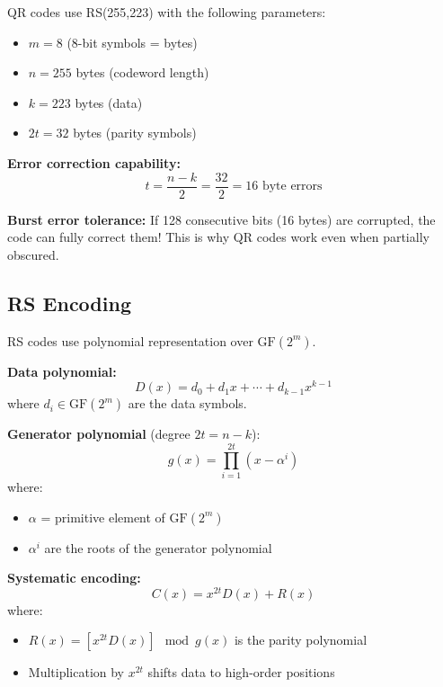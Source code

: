 QR codes use RS(255,223) with the following parameters:
\begin{itemize}
\item $m = 8$ (8-bit symbols = bytes)
\item $n = 255$ bytes (codeword length)
\item $k = 223$ bytes (data)
\item $2t = 32$ bytes (parity symbols)
\end{itemize}

\textbf{Error correction capability:}
\begin{equation}
t = \frac{n-k}{2} = \frac{32}{2} = 16 \text{ byte errors}
\end{equation}

\textbf{Burst error tolerance:} If 128 consecutive bits (16 bytes) are corrupted, the code can fully correct them! This is why QR codes work even when partially obscured.

\subsection{RS Encoding}

RS codes use polynomial representation over $\mathrm{GF}(2^m)$.

\textbf{Data polynomial:}
\begin{equation}
D(x) = d_0 + d_1 x + \cdots + d_{k-1} x^{k-1}
\end{equation}
where $d_i \in \mathrm{GF}(2^m)$ are the data symbols.

\textbf{Generator polynomial} (degree $2t = n-k$):
\begin{equation}
g(x) = \prod_{i=1}^{2t} (x - \alpha^i)
\end{equation}
where:
\begin{itemize}
\item $\alpha$ = primitive element of $\mathrm{GF}(2^m)$
\item $\alpha^i$ are the roots of the generator polynomial
\end{itemize}

\textbf{Systematic encoding:}
\begin{equation}
C(x) = x^{2t} D(x) + R(x)
\end{equation}
where:
\begin{itemize}
\item $R(x) = [x^{2t} D(x)] \mod g(x)$ is the parity polynomial
\item Multiplication by $x^{2t}$ shifts data to high-order positions
\end{itemize}

